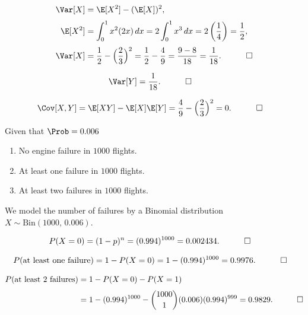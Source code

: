 \begin{hwkProblem}{1}{}
	\hwkPart
	\begin{align*}
		\Var[X] &= \E[X^2] - (\E[X])^2,\\[1mm]
		\E[X^2] &= \int_0^1 x^2 (2x)\,dx = 2\int_0^1 x^3\,dx = 2\left(\frac{1}{4}\right)=\frac{1}{2},\\[1mm]
		\Var[X] &= \frac{1}{2} - \Bigl(\frac{2}{3}\Bigr)^2
		= \frac{1}{2} - \frac{4}{9}
		= \frac{9-8}{18}=\frac{1}{18}. \quad \qed
	\end{align*}

	\hwkPart
	\begin{align*}
		\Var[Y] &= \frac{1}{18}. \quad \qed
	\end{align*}

	\hwkPart
	\begin{align*}
		\Cov[X,Y] &= \E[XY]-\E[X]\E[Y]
		= \frac{4}{9}-\Bigl(\frac{2}{3}\Bigr)^2=0. \quad \qed
	\end{align*}

\end{hwkProblem}

\begin{hwkProblem}{2}{}

	Given that \( \Prob = 0.006 \)
	\begin{enumerate}
		\item No engine failure in \( 1000 \) flights.
		\item At least one failure in \( 1000 \) flights.
		\item At least two failures in \( 1000 \) flights.
	\end{enumerate}

	\hwkSol
	We model the number of failures by a Binomial distribution \( X \sim \text{Bin}(1000,\,0.006) \).

	\hwkPart
	\begin{align*}
		P(X=0) &= (1-p)^n = (0.994)^{1000}=0.002434. \quad \qed
	\end{align*}

	\hwkPart
	\begin{align*}
		P(\text{at least one failure}) &= 1-P(X=0)=1-(0.994)^{1000}=0.9976. \quad \qed
	\end{align*}

	\hwkPart
	\begin{align*}
		P(\text{at least 2 failures}) &= 1-P(X=0)-P(X=1)\\[1mm]
					      &= 1-(0.994)^{1000} - \binom{1000}{1}(0.006)(0.994)^{999}=0.9829. \quad \qed
	\end{align*}

\end{hwkProblem}

